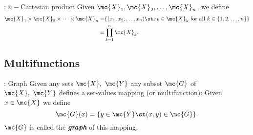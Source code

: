 \begin{ndef}{: \(n-\)Cartesian product}
	Given \(\mc{X}_1,\mc{X}_2,\dots,\mc{X}_n\), we define 
	\begin{align*}
		\mc{X}_1\times \mc{X}_2\times \dots\times \mc{X}_n=&\{(x_1,x_2,\dots,x_n)\st x_k\in \mc{X}_k~\text{for all}~k\in\{1,2,\dots,n\}\}\\
		   =&\prod_{k=1}^{n}\mc{X}_k.
	\end{align*}
\end{ndef}

\subsection{Multifunctions}
\begin{ndef}{: Graph}
	Given any sets \(\mc{X},~\mc{Y}\) any subset \(\mc{G}\) of \(\mc{X},~\mc{Y}\) defines a set-values mapping (or multifunction):
	\medskip
	Given \(x\in \mc{X}\) we define 
	\begin{equation*}
		\mc{G}(x)=\{y\in \mc{Y}\st (x,y)\in \mc{G}\}.
	\end{equation*} 
	\(\mc{G}\) is called the \emph{\textbf{graph}} of this mapping. 
\end{ndef}
